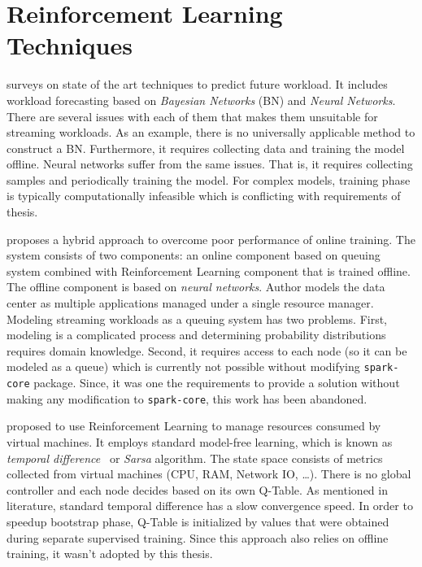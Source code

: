 \section{Reinforcement Learning Techniques}
\label{related:rl}
\textcite{Herbst:2017} surveys on state of the art techniques to predict future workload. It includes workload forecasting based on \emph{Bayesian Networks} (BN) and \emph{Neural Networks}. There are several issues with each of them that makes them unsuitable for streaming workloads. As an example, there is no universally applicable method to construct a BN. Furthermore, it requires collecting data and training the model offline. Neural networks suffer from the same issues. That is, it requires collecting samples and periodically training the model. For complex models, training phase is typically computationally infeasible which is conflicting with requirements of thesis.

\textcite{Tesauro2006} proposes a hybrid approach to overcome poor performance of online training. The system consists of two components: an online component based on queuing system combined with Reinforcement Learning component that is trained offline. The offline component is based on \emph{neural networks}. Author models the data center as multiple applications managed under a single resource manager. Modeling streaming workloads as a queuing system has two problems. First, modeling is a complicated process and determining probability distributions requires domain knowledge. Second, it requires access to each node (so it can be modeled as a queue) which is currently not possible without modifying \lstinline$spark-core$ package. Since, it was one the requirements to provide a solution without making any modification to \lstinline$spark-core$, this work has been abandoned.

\textcite{Rao:2009:VRL} proposed to use Reinforcement Learning to manage resources consumed by virtual machines. It employs standard model-free learning, which is known as \emph{temporal difference}~\cite{rlIntro} or \emph{Sarsa} algorithm. The state space consists of metrics collected from virtual machines (CPU, RAM, Network IO, \dots). There is no global controller and each node decides based on its own Q-Table. As mentioned in literature, standard temporal difference has a slow convergence speed. In order to speedup bootstrap phase, Q-Table is initialized by values that were obtained during separate supervised training. Since this approach also relies on offline training, it wasn't adopted by this thesis.

